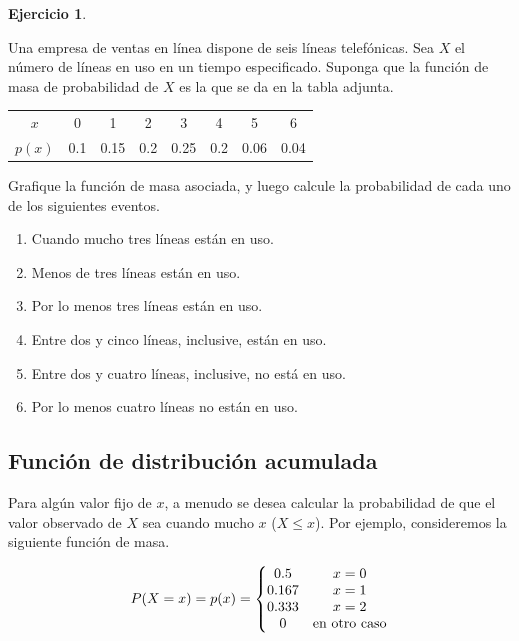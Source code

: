 \documentclass[
  11pt,
]{book}
\providecommand{\tightlist}{%
  \setlength{\itemsep}{0pt}\setlength{\parskip}{0pt}}
\theoremstyle{definition}
\theoremstyle{definition}
\theoremstyle{definition}
\newtheorem{exercise}{Ejercicio}[chapter]
\theoremstyle{definition}
\theoremstyle{remark}
\begin{document}
\begin{exercise}
\protect\hypertarget{exr:telefonica}{}\label{exr:telefonica}

Una empresa de ventas en línea dispone de seis líneas telefónicas. Sea \(X\) el número de líneas en uso en un tiempo especificado. Suponga que la función de masa de probabilidad de \(X\) es la que se da en la tabla adjunta.

\begin{table}[H]
\centering
\begin{tabular}[t]{cccccccc}
\toprule
$x$ & 0 & 1 & 2 & 3 & 4 & 5 & 6\\
$p(x)$ & 0.1 & 0.15 & 0.2 & 0.25 & 0.2 & 0.06 & 0.04\\
\bottomrule
\end{tabular}
\end{table}

Grafique la función de masa asociada, y luego calcule la probabilidad de cada uno de los siguientes eventos.

\begin{enumerate}
\def\labelenumi{\alph{enumi}.}
\tightlist
\item
  Cuando mucho tres líneas están en uso.
\item
  Menos de tres líneas están en uso.
\item
  Por lo menos tres líneas están en uso.
\item
  Entre dos y cinco líneas, inclusive, están en uso.
\item
  Entre dos y cuatro líneas, inclusive, no está en uso.
\item
  Por lo menos cuatro líneas no están en uso.
\end{enumerate}

\end{exercise}

\subsection{Función de distribución acumulada}\label{probabilidad-variable-aleatoria-discreta-fda}

Para algún valor fijo de \(x\), a menudo se desea calcular la probabilidad de que el valor observado de \(X\) sea cuando mucho \(x\) (\(X \leq x\)). Por ejemplo, consideremos la siguiente función de masa.

\begin{equation}
\notag
\begin{split}
P(X = x) = p(x) = \left\lbrace
\begin{matrix}
0.5 & x = 0\\
0.167 & x = 1\\
0.333 & x = 2\\
0 & \text{en otro caso}\\
\end{matrix}
\right.
\end{split}
\end{equation}
\end{document}
